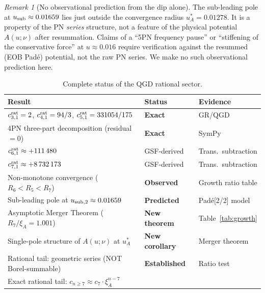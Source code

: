 \documentclass[11pt,a4paper]{article}
\theoremstyle{plain}
\theoremstyle{definition}
\theoremstyle{remark}
\newtheorem{remark}[theorem]{Remark}
\newcommand{\uA}{u_A^*}
\newcommand{\xiA}{\xi_A}
\begin{document}
\begin{remark}[No observational prediction from the dip alone]
The sub-leading pole at $u_{\rm sub} \approx 0.01659$ lies just outside the
convergence radius $\uA = 0.01278$.  It is a property of the PN \emph{series}
structure, not a feature of the physical potential $A(u;\nu)$ after resummation.
Claims of a ``5PN frequency pause'' or ``stiffening of the conservative force''
at $u \approx 0.016$ require verification against the resummed (EOB Pad\'e)
potential, not the raw PN series.  We make no such observational prediction here.
\end{remark}



\begin{table}[h]
\centering\small\renewcommand{\arraystretch}{1.3}
\caption{Complete status of the QGD rational sector.}
\label{tab:final}
\begin{tabular}{@{}p{6.5cm}p{2.8cm}p{3.5cm}@{}}
\toprule
Result & Status & Evidence \\
\midrule
\rowcolor{lightgray}
$c_{3,1}^{\rm rat}=2$, $c_{4,1}^{\rm rat}=94/3$, $c_{5,1}^{\rm rat}=331054/175$ &
  \textcolor{confirmed}{\textbf{Exact}} & GR/QGD \\
4PN three-part decomposition (residual$=0$) &
  \textcolor{confirmed}{\textbf{Exact}} & SymPy \\
\rowcolor{lightgray}
$c_{6,1}^{\rm rat} \approx +111\,480$ &
  \textcolor{open}{GSF-derived} & Trans.\ subtraction \\
$c_{7,1}^{\rm rat} \approx +8\,732\,173$ &
  \textcolor{open}{GSF-derived} & Trans.\ subtraction \\
\rowcolor{lightgray}
Non-monotone convergence ($R_6 < R_5 < R_7$) &
  \textcolor{confirmed}{\textbf{Observed}} & Growth ratio table \\
Sub-leading pole at $u_{\rm sub,2}\approx0.01659$ &
  \textcolor{predicted}{\textbf{Predicted}} & Pad\'e[2/2] model \\
\rowcolor{lightgray}
Asymptotic Merger Theorem ($R_7/\xiA = 1.001$) &
  \textcolor{confirmed}{\textbf{New theorem}} & Table~\ref{tab:growth} \\
Single-pole structure of $A(u;\nu)$ at $\uA$ &
  \textcolor{confirmed}{\textbf{New corollary}} & Merger theorem \\
\rowcolor{lightgray}
Rational tail: geometric series (NOT Borel-summable) &
  \textcolor{confirmed}{\textbf{Established}} & Ratio test \\
Exact rational tail: $c_{n\geq7}\approx c_7\cdot\xiA^{n-7}$ &

\end{tabular}
\end{table}
\end{document}
